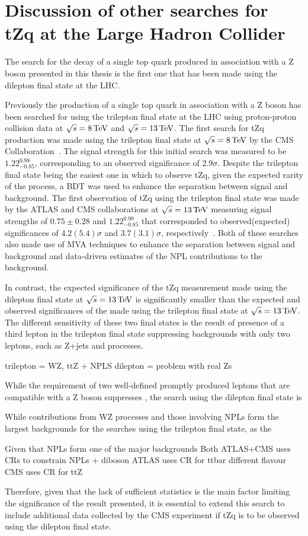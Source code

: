 \section{Discussion of other searches for tZq at the Large Hadron Collider}
The search for the decay of a single top quark produced in association with a Z boson presented in this thesis is the first one that has been made using the dilepton final state at the LHC.

Previously the production of a single top quark in association with a Z boson has been searched for using the trilepton final state at the LHC using proton-proton collision data at $\sqrt{s} = 8 \,\text{Te\hspace{-.08em}V}$ and $\sqrt{s} = 13 \,\text{Te\hspace{-.08em}V}$.
The first search for tZq production was made using the trilepton final state at $\sqrt{s} = 8 \,\text{Te\hspace{-.08em}V}$ by the CMS Collaboration~\cite{Sirunyan:2017kkr}.
The signal strength for this initial search was measured to be $1.22^{0.98}_{-0.85}$, corresponding to an observed significance of $2.9 \sigma$.
Despite the trilepton final state being the easiest one in which to observe tZq, given the expected rarity of the process, a BDT was used to enhance the separation between signal and background.
The first observation of tZq using the trilepton final state was made by the ATLAS and CMS collaborations at $\sqrt{s} = 13 \,\text{Te\hspace{-.08em}V}$ measuring signal strengths of $0.75 \pm 0.28$ and $1.22^{0.98}_{-0.85}$ that corresponded to observed(expected) significances of $4.2(5.4)\sigma$ and $3.7(3.1)\sigma$, respectively~\cite{Aaboud:2017ylb,Sirunyan:2017nbr}.
Both of these searches also made use of MVA techniques to enhance the separation between signal and background and data-driven estimates of the NPL contributions to the background.

In contrast, the expected significance of the tZq measurement made using the dilepton final state at $\sqrt{s} = 13 \,\text{Te\hspace{-.08em}V}$ is significantly smaller than the expected and observed significances of the made using the trilepton final state at $\sqrt{s} = 13 \,\text{Te\hspace{-.08em}V}$.
The different sensitivity of these two final states is the result of presence of a third lepton in the trilepton final state suppressing backgrounds with only two leptons, such as Z+jets and \ttbar processes.

trilepton = WZ, ttZ + NPLS
dilepton = problem with real Zs

While the requirement of two well-defined promptly produced leptons that are compatible with a Z boson suppresses
, the search using the dilepton final state is 
 
While contributions from WZ processes and those involving NPLs form the largest backgrounds for the searches using the trilepton final state, as the 

Given that NPLs form one of the major backgrounds 
Both ATLAS+CMS uses CRs to constrain NPLs + diboson
ATLAS uses CR for ttbar different flavour
CMS uses CR for ttZ

Therefore, given that the lack of sufficient statistics is the main factor limiting the significance of the result presented, it is essential to extend this search to include additional data collected by the CMS experiment if tZq is to be observed using the dilepton final state.
